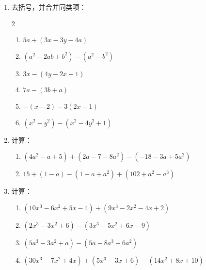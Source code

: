 \begin{enumerate}
\item 去括号，并合并同类项：
   \begin{multicols}{2}
\begin{enumerate}
    \item  $5 a+(3 x-3 y-4 a)$
    \item   $\left(a^{2}-2 a b+b^{2}\right)-\left(a^{2}-b^{2}\right)$
    \item  $3 x-(4 y-2 x+1) $
    \item   $7 a-(3 b+a)$
    \item  $-(x-2)-3(2 x-1)$
    \item  $\left(x^{2}-y^{2}\right)-\left(x^{2}-4 y^{2}+1\right)$
     
\end{enumerate}
    \end{multicols}

\item 计算：
\begin{enumerate}
    \item $\left(4 a^{2}-a+5\right)+\left(2 a-7-8 a^{2}\right)-(-18-3 a+5 a^{2})$%
    \item $15+(1-a)-\left(1-a+a^{2}\right)+\left(102+a^{2}-a^{3}\right)$%
\end{enumerate}

    \item 计算：
    \begin{enumerate}
        \item $\left(10 x^{3}-6 x^{2}+5 x-4\right)+\left(9 x^{3}-2 x^{2}-4 x+2\right)$
        \item $\left(2 x^{3}-3 x^{2}+6\right)-\left(3 x^{3}-5 x^{2}+6 x-9\right)$
        \item $\left(5 a^{3}-3 a^{2}+a\right)-\left(5 a-8 a^{3}+6 a^{2}\right)$
        \item $\left(30 x^{3}-7 x^{2}+4 x\right)+\left(5 x^{3}-3 x+6\right)-(14 x^{2}+8 x+10)$
\end{enumerate}


\end{enumerate}
